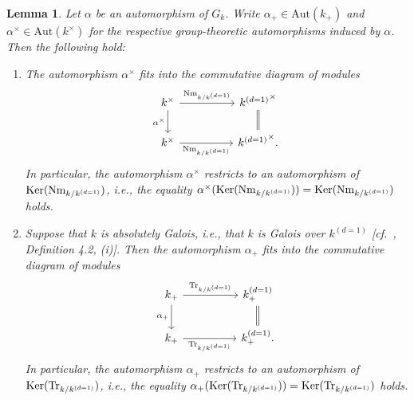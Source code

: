 \documentclass[11pt,showkeys]{article}
\theoremstyle{theorem}
\newtheorem{lem}[theorem]{Lemma}
\theoremstyle{definition}
\begin{document}
\begin{lem}\label{lemma:2.2}
Let $\alpha$ be an automorphism of $G_k$.  Write $\alpha_+ \in \mathrm{Aut}(k_+)$ and $\alpha^{\times} \in \mathrm{Aut}(k^{\times})$ for the respective group-theoretic automorphisms induced by $\alpha$. Then the following hold:
\begin{enumerate}[label=(\roman*),ref=(\roman*)]
   \item[\rm (i)] The automorphism $\alpha^\times$ fits into the commutative diagram of modules
\[
\begin{tikzcd}
k^\times \arrow[rr, "{\rm Nm}_{k/k^{(d=1)}}"] \arrow[d, "\alpha^\times"'] && {k^{(d=1)}}^\times \arrow[d, equal] \\
k^\times \arrow[rr, "{\rm Nm}_{k/k^{(d=1)}}"']                         && {k^{(d=1)}}^\times.                
\end{tikzcd}
\]
In particular, the automorphism $\alpha^{\times}$ restricts to an  automorphism of \ ${\rm Ker}({\rm Nm}_{k/k^{(d=1)}})$, i.e., the equality $\alpha^{\times}({\rm Ker}({\rm Nm}_{k/k^{(d=1)}})) = {\rm Ker}({\rm Nm}_{k/k^{(d=1)}})$ holds. \label{lemma:2.2:statement:1}
   \item[\rm (ii)] Suppose that $k$ is absolutely Galois, i.e., that $k$ is Galois over $k^{(d=1)}$ [cf.\ \cite{Hoshi2}, Definition 4.2, (i)]. Then the automorphism $\alpha_{+}$ fits into the commutative diagram of modules
\[
\begin{tikzcd}
k_{+} \arrow[rr, "{\rm Tr}_{k/k^{(d=1)}}"] \arrow[d, "\alpha_{+}"'] && k^{(d=1)}_+ \arrow[d, equal] \\
k_{+} \arrow[rr, "{\rm Tr}_{k/k^{(d=1)}}"']                         && k^{(d=1)}_+.                
\end{tikzcd}
\]
In particular, the automorphism $\alpha_+$ restricts to an  automorphism of \ ${\rm Ker}({\rm Tr}_{k/k^{(d=1)}})$, i.e., the equality $\alpha_+({\rm Ker}({\rm Tr}_{k/k^{(d=1)}})) = {\rm Ker}({\rm Tr}_{k/k^{(d=1)}})$ holds.
\end{enumerate} \label{lemma:2.2:statement:2}
\end{lem}
\end{document}
